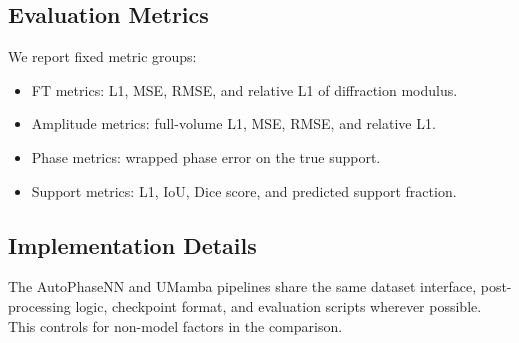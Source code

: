\subsection{Evaluation Metrics}
We report fixed metric groups:
\begin{itemize}
  \item FT metrics: L1, MSE, RMSE, and relative L1 of diffraction modulus.
  \item Amplitude metrics: full-volume L1, MSE, RMSE, and relative L1.
  \item Phase metrics: wrapped phase error on the true support.
  \item Support metrics: L1, IoU, Dice score, and predicted support fraction.
\end{itemize}

\subsection{Implementation Details}
The AutoPhaseNN and UMamba pipelines share the same dataset interface,
post-processing logic, checkpoint format, and evaluation scripts wherever
possible. This controls for non-model factors in the comparison.
